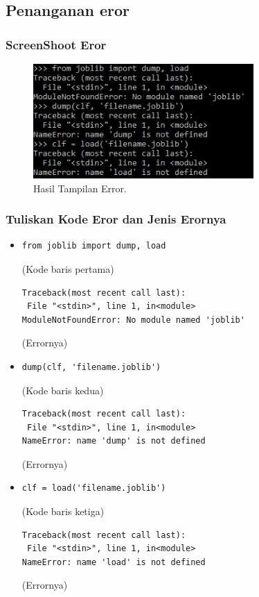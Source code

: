 \subsection{Penanganan eror}
\subsubsection{ScreenShoot Eror}
\begin{figure}[ht]\centerline{\includegraphics[width=0.75\textwidth]{figures/huda/18.JPG}}\caption{Hasil Tampilan Error.}\end{figure}
\subsubsection{Tuliskan Kode Eror dan Jenis Erornya}
\begin{itemize}
\item \begin{verbatim}from joblib import dump, load\end{verbatim} (Kode baris pertama)
\subitem \begin{verbatim}
Traceback(most recent call last):
 File "<stdin>", line 1, in<module>
ModuleNotFoundError: No module named 'joblib'
\end{verbatim} (Errornya)
\item \begin{verbatim}dump(clf, 'filename.joblib')\end{verbatim} (Kode baris kedua)
\subitem \begin{verbatim}
Traceback(most recent call last):
 File "<stdin>", line 1, in<module>
NameError: name 'dump' is not defined
\end{verbatim} (Errornya)
\item \begin{verbatim}clf = load('filename.joblib')\end{verbatim} (Kode baris ketiga)
\subitem \begin{verbatim}
Traceback(most recent call last):
 File "<stdin>", line 1, in<module>
NameError: name 'load' is not defined
\end{verbatim} (Errornya)
\end{itemize}
